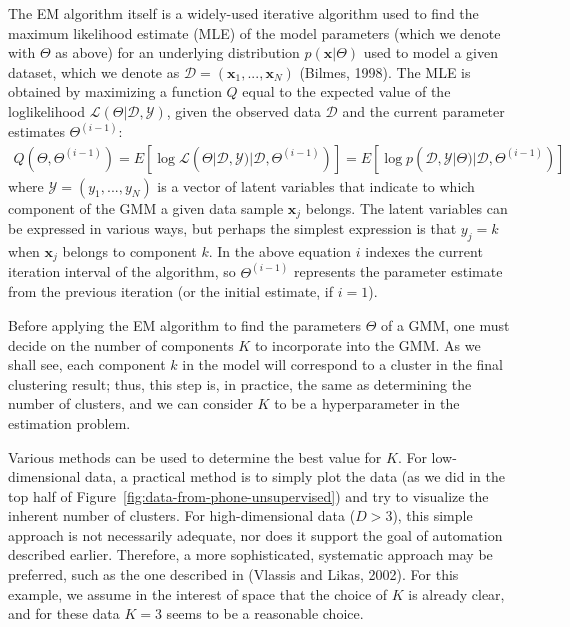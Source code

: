 The EM algorithm itself is a widely-used iterative algorithm used to find the maximum likelihood estimate (MLE) of the model parameters (which we denote with $\Theta$ as above) for an underlying distribution $p(\mathbf{x}|\Theta)$ used to model a given dataset, which we denote as $\mathcal{D} = (\mathbf{x}_1,..., \mathbf{x}_N)$ (Bilmes, 1998). The MLE is obtained by maximizing a function $Q$ equal to the expected value of the loglikelihood $\mathcal{L}(\Theta|\mathcal{D},\mathcal{Y})$, given the observed data $\mathcal{D}$ and the current parameter estimates $\Theta^{(i-1)}$:
%
\begin{gather}
  Q(\Theta,\Theta^{(i-1)}) = E[\log \mathcal{L}(\Theta|\mathcal{D}, \mathcal{Y})|\mathcal{D},\Theta^{(i-1)})]
     = E[\log p(\mathcal{D}, \mathcal{Y}|\Theta)|\mathcal{D},\Theta^{(i-1)})]
\end{gather}
%
where $\mathcal{Y} = (y_1, ..., y_N)$ is a vector of latent variables that indicate to which component of the GMM a given data sample $\mathbf{x}_j$ belongs. The latent variables can be expressed in various ways, but perhaps the simplest expression is that $y_j = k$ when $\mathbf{x}_j$ belongs to component $k$. In the above equation $i$ indexes the current iteration interval of the algorithm, so $\Theta^{(i-1)}$ represents the parameter estimate from the previous iteration (or the initial estimate, if $i=1$).

Before applying the EM algorithm to find the parameters $\Theta$ of a GMM, one must decide on the number of components $K$ to incorporate into the GMM. As we shall see, each component $k$ in the model will correspond to a cluster in the final clustering result; thus, this step is, in practice, the same as determining the number of clusters, and we can consider $K$ to be a hyperparameter in the estimation problem.

Various methods can be used to determine the best value for $K$. For low-dimensional data, a practical method is to simply plot the data (as we did in the top half of Figure~\ref{fig:data-from-phone-unsupervised}) and try to visualize the inherent number of clusters. For high-dimensional data ($D>3$), this simple approach is not necessarily adequate, nor does it support the goal of automation described earlier. Therefore, a more sophisticated, systematic approach may be preferred, such as the one described in (Vlassis and Likas, 2002). For this example, we assume in the interest of space that the choice of $K$ is already clear, and for these data $K=3$ seems to be a reasonable choice.


